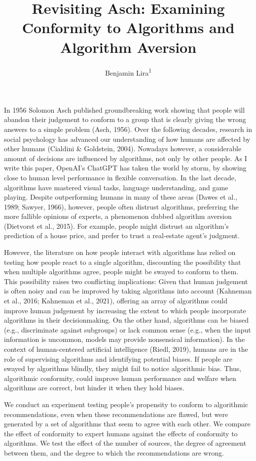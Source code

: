 \documentclass[
  man ,floatsintext]{apa7}
\title{Revisiting Asch: Examining Conformity to Algorithms and Algorithm Aversion}
\author{Benjamin Lira\textsuperscript{1}}
\date{}
\affiliation{\vspace{0.5cm}\textsuperscript{1} University of Pennsylvania}
\begin{document}
\maketitle

In 1956 Solomon Asch published groundbreaking work showing that people will abandon their judgement to conform to a group that is clearly giving the wrong answers to a simple problem (Asch, 1956). Over the following decades, research in social psychology has advanced our understanding of how humans are affected by other humans (Cialdini \& Goldstein, 2004). Nowadays however, a considerable amount of decisions are influenced by algorithms, not only by other people. As I write this paper, OpenAI's ChatGPT has taken the world by storm, by showing close to human level performance in flexible conversation. In the last decade, algorithms have mastered visual tasks, language understanding, and game playing. Despite outperforming humans in many of these areas (Dawes et al., 1989; Sawyer, 1966), however, people often distrust algorithms, preferring the more fallible opinions of experts, a phenomenon dubbed algorithm aversion (Dietvorst et al., 2015). For example, people might distrust an algorithm's prediction of a house price, and prefer to trust a real-estate agent's judgment.

However, the literature on how people interact with algorithms has relied on testing how people react to a single algorithm, discounting the possibility that when multiple algorithms agree, people might be swayed to conform to them. This possibility raises two conflicting implications: Given that human judgement is often noisy and can be improved by taking algorithms into account (Kahneman et al., 2016; Kahneman et al., 2021), offering an array of algorithms could improve human judgement by increasing the extent to which people incorporate algorithms in their decisionmaking. On the other hand, algorithms can be biased (e.g., discriminate against subgroups) or lack common sense (e.g., when the input information is uncommon, models may provide nonsensical information). In the context of human-centered artificial intelligence (Riedl, 2019), humans are in the role of supervising algorithms and identifying potential biases. If people are swayed by algorithms blindly, they might fail to notice algorithmic bias. Thus, algorithmic conformity, could improve human performance and welfare when algorithms are correct, but hinder it when they hold biases.

We conduct an experiment testing people's propensity to conform to algorithmic recommendations, even when these recommendations are flawed, but were generated by a set of algorithms that seem to agree with each other. We compare the effect of conformity to expert humans against the effects of conformity to algorithms. We test the effect of the number of sources, the degree of agreement between them, and the degree to which the recommendations are wrong.
\end{document}
